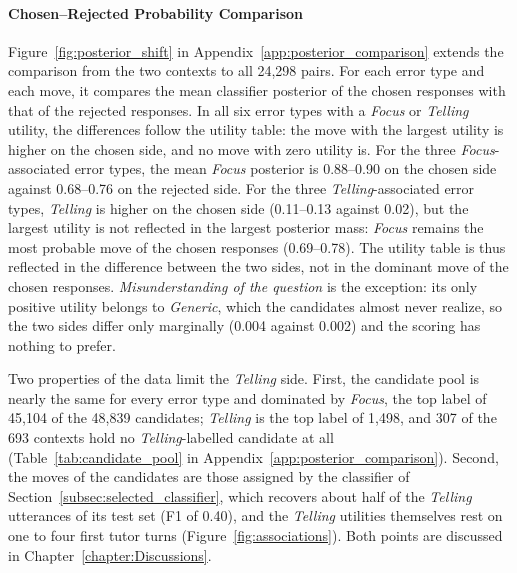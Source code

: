 \paragraph{Chosen--Rejected Probability Comparison}
Figure~\ref{fig:posterior_shift} in Appendix~\ref{app:posterior_comparison} extends the comparison from the two contexts to all 24,298 pairs. For each error type and each move, it compares the mean classifier posterior of the chosen responses with that of the rejected responses. In all six error types with a \textit{Focus} or \textit{Telling} utility, the differences follow the utility table: the move with the largest utility is higher on the chosen side, and no move with zero utility is. For the three \textit{Focus}-associated error types, the mean \textit{Focus} posterior is 0.88--0.90 on the chosen side against 0.68--0.76 on the rejected side. For the three \textit{Telling}-associated error types, \textit{Telling} is higher on the chosen side (0.11--0.13 against 0.02), but the largest utility is not reflected in the largest posterior mass: \textit{Focus} remains the most probable move of the chosen responses (0.69--0.78). The utility table is thus reflected in the difference between the two sides, not in the dominant move of the chosen responses. \textit{Misunderstanding of the question} is the exception: its only positive utility belongs to \textit{Generic}, which the candidates almost never realize, so the two sides differ only marginally (0.004 against 0.002) and the scoring has nothing to prefer.

Two properties of the data limit the \textit{Telling} side. First, the candidate pool is nearly the same for every error type and dominated by \textit{Focus}, the top label of 45,104 of the 48,839 candidates; \textit{Telling} is the top label of 1,498, and 307 of the 693 contexts hold no \textit{Telling}-labelled candidate at all (Table~\ref{tab:candidate_pool} in Appendix~\ref{app:posterior_comparison}). Second, the moves of the candidates are those assigned by the classifier of Section~\ref{subsec:selected_classifier}, which recovers about half of the \textit{Telling} utterances of its test set (F1 of 0.40), and the \textit{Telling} utilities themselves rest on one to four first tutor turns (Figure~\ref{fig:associations}). Both points are discussed in Chapter~\ref{chapter:Discussions}.

